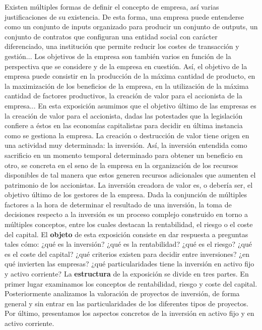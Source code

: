 \documentclass{nuevotema}
\begin{document}
\ideaclave

Existen múltiples formas de definir el concepto de empresa, así varias justificaciones de su existencia. De esta forma, una empresa puede entenderse como un conjunto de inputs organizado para producir un conjunto de outputs, un conjunto de contratos que configuran una entidad social con carácter diferenciado, una institución que permite reducir los costes de transacción y gestión... Los objetivos de la empresa son también varios en función de la perspectiva que se considere y de la empresa en cuestión. Así, el objetivo de la empresa puede consistir en la producción de la máxima cantidad de producto, en la maximización de los beneficios de la empresa, en la utilización de la máxima cantidad de factores productivos, la creación de valor para el accionista de la empresa... En esta exposición asumimos que el objetivo último de las empresas es la creación de valor para el accionista, dadas las potestades que la legislación confiere a éstos en las economías capitalistas para decidir en última instancia como se gestiona la empresa. La creación o destrucción de valor tiene origen en una actividad muy determinada: la inversión. Así, la inversión entendida como sacrificio en un momento temporal determinado para obtener un beneficio en otro, se concreta en el seno de la empresa en la organización de los recursos disponibles de tal manera que estos generen recursos adicionales que aumenten el patrimonio de los accionistas. La inversión creadora de valor es, o debería ser, el objetivo último de los gestores de la empresa. Dada la conjunción de múltiples factores a la hora de determinar el resultado de una inversión, la toma de decisiones respecto a la inversión es un proceso complejo construido en torno a múltiples conceptos, entre los cuales destacan la rentabilidad, el riesgo o el coste del capital. El \textbf{objeto} de esta exposición consiste en dar respuesta a preguntas tales cómo: ¿qué es la inversión? ¿qué es la rentabilidad? ¿qué es el riesgo? ¿qué es el coste del capital? ¿qué criterios existen para decidir entre inversiones? ¿en qué invierten las empresas? ¿qué particularidades tiene la inversión en activo fijo y activo corriente? La \textbf{estructura} de la exposición se divide en tres partes. En primer lugar examinamos los conceptos de rentabilidad, riesgo y coste del capital. Posteriormente analizamos la valoración de proyectos de inversión, de forma general y sin entrar en las particularidades de los diferentes tipos de proyectos. Por último, presentamos los aspectos concretos de la inversión en activo fijo y en activo corriente.
\end{document}
